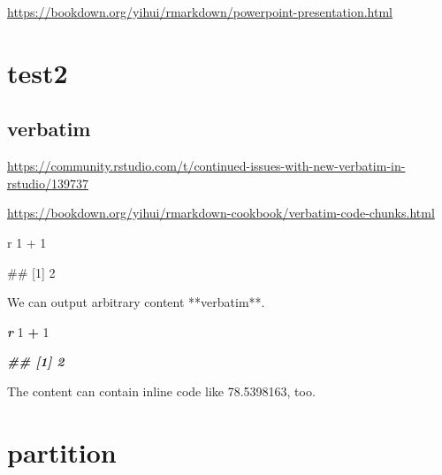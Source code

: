 \documentclass[
]{book}
\newenvironment{Shaded}{\begin{snugshade}}{\end{snugshade}}
\newcommand{\DecValTok}[1]{\textcolor[rgb]{0.00,0.00,0.81}{#1}}
\newcommand{\InformationTok}[1]{\textcolor[rgb]{0.56,0.35,0.01}{\textbf{\textit{#1}}}}
\newcommand{\NormalTok}[1]{#1}
\newcommand{\SpecialCharTok}[1]{\textcolor[rgb]{0.81,0.36,0.00}{\textbf{#1}}}
\theoremstyle{definition}
\theoremstyle{definition}
\theoremstyle{definition}
\theoremstyle{definition}
\theoremstyle{remark}
\begin{document}
\url{https://bookdown.org/yihui/rmarkdown/powerpoint-presentation.html}

\hypertarget{test2}{%
\chapter{test2}\label{test2}}

\hypertarget{verbatim}{%
\section{verbatim}\label{verbatim}}

\url{https://community.rstudio.com/t/continued-issues-with-new-verbatim-in-rstudio/139737}

\url{https://bookdown.org/yihui/rmarkdown-cookbook/verbatim-code-chunks.html}

\begin{Shaded}
\begin{Highlighting}[]


\NormalTok{\textasciigrave{}\textasciigrave{}\textasciigrave{}r}
\NormalTok{1 + 1}
\NormalTok{\textasciigrave{}\textasciigrave{}\textasciigrave{}}

\NormalTok{\textasciigrave{}\textasciigrave{}\textasciigrave{}}
\NormalTok{\#\# [1] 2}
\NormalTok{\textasciigrave{}\textasciigrave{}\textasciigrave{}}
\end{Highlighting}
\end{Shaded}

\begin{Shaded}
\begin{Highlighting}[]
\NormalTok{We can output arbitrary content **verbatim**.}


\InformationTok{\textasciigrave{}\textasciigrave{}\textasciigrave{}r}
\DecValTok{1} \SpecialCharTok{+} \DecValTok{1}
\InformationTok{\textasciigrave{}\textasciigrave{}\textasciigrave{}}

\InformationTok{\textasciigrave{}\textasciigrave{}\textasciigrave{}}
\InformationTok{\#\# [1] 2}
\InformationTok{\textasciigrave{}\textasciigrave{}\textasciigrave{}}

\NormalTok{The content can contain inline code like}
\NormalTok{78.5398163, too.}
\end{Highlighting}
\end{Shaded}

\hypertarget{partition}{%
\chapter{partition}\label{partition}}
\end{document}
